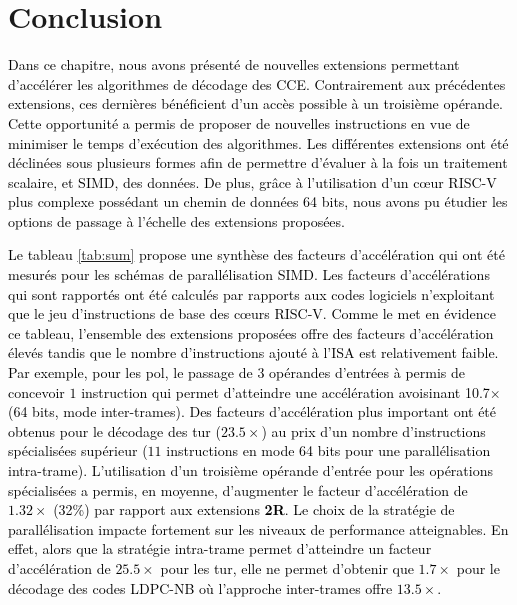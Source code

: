 \documentclass[../main.tex]{subfiles}
\begin{document}
%
%
%
%
\section{Conclusion}
%
%
%
%
\textcolor{black}{Dans ce chapitre, nous avons présenté de nouvelles extensions permettant d'accélérer les algorithmes de décodage des CCE. 
Contrairement aux précédentes extensions, ces dernières bénéficient d'un accès possible à un troisième opérande. 
Cette opportunité a permis de proposer de nouvelles instructions en vue de minimiser le temps d'exécution des algorithmes. 
Les différentes extensions ont été déclinées sous plusieurs formes afin de permettre d'évaluer à la fois un traitement scalaire, et SIMD, des données. 
De plus, grâce à l'utilisation d'un cœur RISC-V plus complexe possédant un chemin de données 64 bits, nous avons pu étudier les options de passage à l'échelle des extensions proposées.}

\textcolor{black}{Le tableau \ref{tab:sum} propose une synthèse des facteurs d'accélération qui ont été mesurés pour les schémas de parallélisation SIMD. 
Les facteurs d'accélérations qui sont rapportés ont été calculés par rapports aux codes logiciels n'exploitant que le jeu d'instructions de base des cœurs RISC-V. 
Comme le met en évidence ce tableau, l'ensemble des extensions proposées offre des facteurs d'accélération élevés tandis que le nombre d'instructions ajouté à l'ISA est relativement faible. 
Par exemple, pour les \acrlong{pol}, le passage de $3$ opérandes d'entrées à permis de concevoir $1$ instruction qui permet d'atteindre une accélération avoisinant 10.7$\times$ (64 bits, mode inter-trames). 
Des facteurs d'accélération plus important ont été obtenus pour le décodage des \acrlong{tur} ($23.5\times$) au prix d'un nombre d'instructions spécialisées supérieur ($11$ instructions en mode 64 bits pour une parallélisation intra-trame). 
L'utilisation d'un troisième opérande d'entrée pour les opérations spécialisées a permis, en moyenne, d'augmenter le facteur d'accélération de $1.32\times$ (32\%) par rapport aux extensions \textbf{2R}.
Le choix de la stratégie de parallélisation impacte fortement sur les niveaux de performance atteignables. 
En effet, alors que la stratégie intra-trame permet d'atteindre un facteur d'accélération de $25.5\times$ pour les \acrlong{tur}, elle ne permet d'obtenir que $1.7\times$ pour le décodage des codes LDPC-NB où l'approche inter-trames offre $13.5\times$.}
\end{document}
